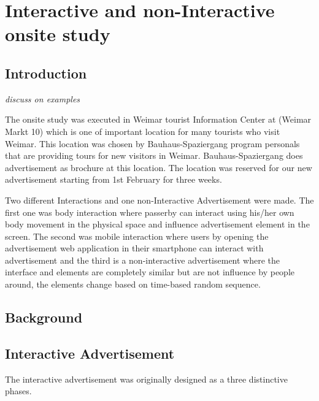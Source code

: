 \chapter{Interactive and non-Interactive onsite study} %

\label{Chapter8} %
\newpage




\section{Introduction}




\emph{discuss on examples}





The onsite study was executed in Weimar tourist Information Center at (Weimar Markt 10) which is one of important location for many tourists who visit Weimar. This location was chosen by Bauhaus-Spaziergang program personals that are providing tours for new visitors in Weimar. Bauhaus-Spaziergang does advertisement as brochure at this location. The location was reserved for our new advertisement starting from 1st February for three weeks. 

Two different Interactions and one non-Interactive Advertisement were made. The first one was body interaction where passerby can interact using his/her own body movement in the physical space and influence advertisement element in the screen. The second was mobile interaction where users by opening the advertisement web application in their smartphone can interact with advertisement and the third is a non-interactive advertisement where the interface and elements are completely similar but are not influence by people around, the elements change based on time-based random sequence. 



\section{Background}



\section{Interactive Advertisement}

The interactive advertisement was originally designed as a three distinctive phases.


